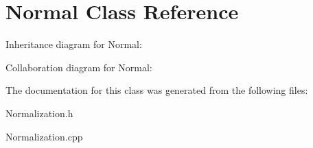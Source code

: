 \hypertarget{classNormal}{}\section{Normal Class Reference}
\label{classNormal}


Inheritance diagram for Normal\+:


Collaboration diagram for Normal\+:


The documentation for this class was generated from the following files\+:\begin{DoxyCompactItemize}
\item 
Normalization.\+h\item 
Normalization.\+cpp\end{DoxyCompactItemize}
